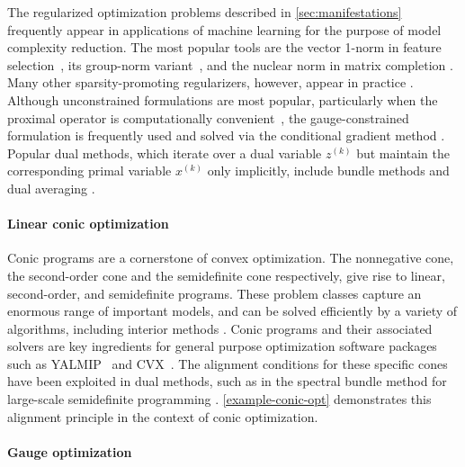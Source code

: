 The regularized optimization problems described in \autoref{sec:manifestations}
frequently appear in applications of machine learning for the purpose of model
complexity reduction. The most popular tools are the vector 1-norm in feature
selection~\cite{tibshirani1996regression}, its group-norm
variant~\cite{jacob2009group}, and the nuclear norm in matrix completion
\cite{recht2010guaranteed}. 
Many other sparsity-promoting regularizers, however,
appear in practice \cite{zeng2014ordered}. Although unconstrained formulations
are most popular, particularly when the proximal operator is computationally
convenient~\cite{parikh2013proximal}, the gauge-constrained formulation is
frequently used and solved via the conditional gradient method
\cite{frank1956algorithm,dunn1978conditional,jaggi2013revisiting}. Popular dual
methods, which iterate over a dual variable $z^{(k)}$ but maintain the
corresponding primal variable $x^{(k)}$ only implicitly, include bundle methods
\cite{lemarechal1981bundle} and dual averaging
\citep{xiao2010dual,duchi2012dual}.

\paragraph{Linear conic optimization}

Conic programs are a cornerstone of convex optimization. The nonnegative cone,
the second-order cone and the semidefinite cone respectively, give rise to
linear, second-order, and semidefinite programs. These problem classes capture
an enormous range of important models, and can be solved efficiently by a
variety of algorithms, including interior methods
\cite{karmarkar1984new,nen94,rene:2001}. Conic programs and their associated
solvers are key ingredients for general purpose optimization software packages
such as YALMIP~\citep{lofberg2004yalmip} and CVX~\cite{grant2008cvx}. The
alignment conditions for these specific cones have been exploited in dual
methods, such as in the spectral bundle method for large-scale semidefinite
programming \cite{helmberg2000spectral}. \autoref{example-conic-opt} demonstrates
this alignment principle in the context of conic optimization.

\paragraph{Gauge optimization} 

